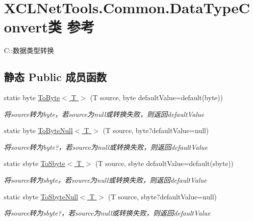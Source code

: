 \hypertarget{class_x_c_l_net_tools_1_1_common_1_1_data_type_convert}{\section{X\-C\-L\-Net\-Tools.\-Common.\-Data\-Type\-Convert类 参考}
\label{class_x_c_l_net_tools_1_1_common_1_1_data_type_convert}
}


C\-::数据类型转换  


\subsection*{静态 Public 成员函数}
\begin{DoxyCompactItemize}
\item 
static byte \hyperlink{class_x_c_l_net_tools_1_1_common_1_1_data_type_convert_a71686d4590f91717c2f2fe9393466dbc}{To\-Byte$<$ T $>$} (T source, byte default\-Value=default(byte))
\begin{DoxyCompactList}\small\item\em 将source转为byte，若source为null或转换失败，则返回default\-Value \end{DoxyCompactList}\item 
static byte \hyperlink{class_x_c_l_net_tools_1_1_common_1_1_data_type_convert_a62e1bf3447e80205b377939f0888bbf8}{To\-Byte\-Null$<$ T $>$} (T source, byte?default\-Value=null)
\begin{DoxyCompactList}\small\item\em 将source转为byte?，若source为null或转换失败，则返回default\-Value \end{DoxyCompactList}\item 
static sbyte \hyperlink{class_x_c_l_net_tools_1_1_common_1_1_data_type_convert_abb4e728dc94f4198376274d06f46b0cf}{To\-Sbyte$<$ T $>$} (T source, sbyte default\-Value=default(sbyte))
\begin{DoxyCompactList}\small\item\em 将source转为sbyte，若source为null或转换失败，则返回default\-Value \end{DoxyCompactList}\item 
static sbyte \hyperlink{class_x_c_l_net_tools_1_1_common_1_1_data_type_convert_aea0c021384b87c5efd69313b13ae41d8}{To\-Sbyte\-Null$<$ T $>$} (T source, sbyte?default\-Value=null)
\begin{DoxyCompactList}\small\item\em 将source转为sbyte?，若source为null或转换失败，则返回default\-Value \end{DoxyCompactList}\item 

\end{DoxyCompactItemize}
